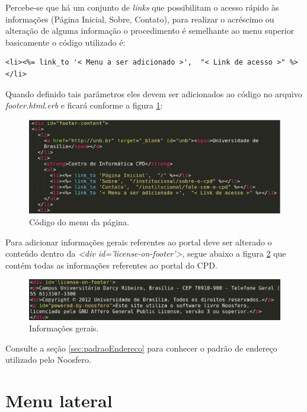 Percebe-se que há um conjunto de \emph{links} que possibilitam o acesso rápido às informações (Página Inicial, Sobre, Contato), para realizar o acréscimo ou alteração de alguma informação o procedimento é semelhante ao menu superior basicamente o código utilizado é:

\begin{lstlisting}
<li><%= link_to '< Menu a ser adicionado >',  "< Link de acesso >" %></li>
\end{lstlisting}

Quando definido tais parâmetros eles devem ser adicionados ao código no arquivo \emph{footer.html.erb} e ficará conforme a figura \ref{fig:codMenu}:

\begin{figure}[h]
     \centering
       \includegraphics[keepaspectratio=true,scale=0.3]{figuras/footerMenu.eps}
     \caption{Código do menu da página.}
     \label{fig:codMenu}
\end{figure}

\newpage
Para adicionar informações gerais referentes ao portal deve ser alterado o conteúdo dentro da \emph{<div id='license-on-footer'>}, segue abaixo a figura \ref{fig:infGeral} que contém todas as informações referentes ao portal do CPD.

\begin{figure}[h]
     \centering
       \includegraphics[keepaspectratio=true,scale=0.49]{figuras/informacoesGeraisRodape.eps}
     \caption{Informações gerais.}
     \label{fig:infGeral}
\end{figure}

Consulte a seção \ref{sec:padraoEndereco} para conhecer o padrão de endereço utilizado pelo Noosfero.

\newpage
\section{Menu lateral}

